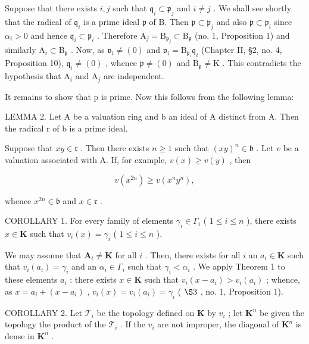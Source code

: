 Suppose that there exists \(i, j\) such that \(\mathfrak{q}_i \subset \mathfrak{p}_j\) and \(i \neq j\) . We shall see shortly that the radical of \(\mathfrak{q}_i\) is a prime ideal \(\mathfrak{p}\) of B. Then \(\mathfrak{p} \subset \mathfrak{p}_j\) and also \(\mathfrak{p} \subset \mathfrak{p}_i\) since \(\alpha_i > 0\) and hence \(\mathfrak{q}_i \subset \mathfrak{p}_i\) . Therefore \(\mathrm{A}_j = \mathrm{B}_{\mathfrak{p}_j} \subset \mathrm{B}_{\mathfrak{p}}\) (no. 1, Proposition 1) and similarly \(\mathrm{A}_i \subset \mathrm{B}_{\mathfrak{p}}\) . Now, as \(\mathfrak{v}_i \neq (0)\) and \(\mathfrak{v}_i = \mathrm{B}_{\mathfrak{p}_i} \mathfrak{q}_i\) (Chapter II, §2, no. 4, Proposition 10), \(\mathfrak{q}_i \neq (0)\) , whence \(\mathfrak{p} \neq (0)\) and \(\mathrm{B}_{\mathfrak{p}} \neq \mathrm{K}\) . This contradicts the hypothesis that \(\mathrm{A}_i\) and \(\mathrm{A}_j\) are independent.

It remains to show that p is prime. Now this follows from the following lemma:

LEMMA 2. Let A be a valuation ring and b an ideal of A distinct from A. Then the radical r of b is a prime ideal.

Suppose that \(xy \in \mathfrak{r}\) . Then there exists \(n \geqslant 1\) such that \((xy)^n \in \mathfrak{b}\) . Let \(v\) be a valuation associated with A. If, for example, \(v(x) \geqslant v(y)\) , then

\[
v (x ^ {2 n}) \geqslant v (x ^ {n} y ^ {n}),
\]

whence \(x^{2n} \in \mathfrak{b}\) and \(x \in \mathfrak{r}\) .

COROLLARY 1. For every family of elements \(\gamma_{i} \in \Gamma_{i}\) ( \(1 \leqslant i \leqslant n\) ), there exists \(x \in \mathbf{K}\) such that \(v_{i}(x) = \gamma_{i}\) ( \(1 \leqslant i \leqslant n\) ).

We may assume that \(\mathbf{A}_i \neq \mathbf{K}\) for all \(i\) . Then, there exists for all \(i\) an \(a_i \in \mathbf{K}\) such that \(v_i(a_i) = \gamma_i\) and an \(\alpha_i \in \Gamma_i\) such that \(\gamma_i < \alpha_i\) . We apply Theorem 1 to these elements \(a_i\) : there exists \(x \in \mathbf{K}\) such that \(v_i(x - a_i) > v_i(a_i)\) ; whence, as \(x = a_i + (x - a_i)\) , \(v_i(x) = v_i(a_i) = \gamma_i\) ( \(\S 3\) , no. 1, Proposition 1).

COROLLARY 2. Let \(\mathcal{T}_i\) be the topology defined on \(\mathbf{K}\) by \(v_i\) ; let \(\mathbf{K}^n\) be given the topology the product of the \(\mathcal{T}_i\) . If the \(v_i\) are not improper, the diagonal of \(\mathbf{K}^n\) is dense in \(\mathbf{K}^n\) .

